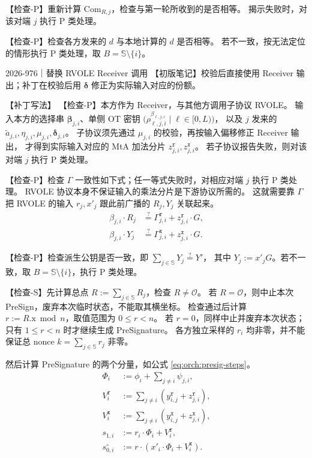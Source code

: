 【检查-P】重新计算 $\mathrm{Com}_{R,j}$，检查与第一轮所收到的是否相等。
揭示失败时，对该对端 $j$ 执行 P 类处理。

【检查-P】检查各方发来的 $d$ 与本地计算的 $d$ 是否相等。
若不一致，按无法定位的情形执行 P 类处理，取 $B=\mathbb S\setminus\{i\}$。

\begin{patchnote}{2026-976｜替换 RVOLE Receiver 调用}
【初版笔记】校验后直接使用 Receiver 输出；补丁在校验后用 $\boldsymbol\delta$ 修正为实际输入对应的份额。

【补丁写法】
【检查-P】本方作为 Receiver，与其他方调用子协议 RVOLE。
输入本方的选择串 $\boldsymbol{\beta}_{j,i}$、单侧 OT 密钥
$\bigl(\rho^{\beta_{\ell,j,i}}_{\ell,j,i} \mid \ell\in[0,L)\bigr)$，
以及 $j$ 发来的 $\tilde a_{j,i},\eta_{j,i},\mu_{j,i},\boldsymbol\delta_{j,i}$。
子协议须先通过 $\mu_{j,i}$ 的校验，再按输入偏移修正 Receiver 输出，
才得到实际输入对应的 MtA 加法分片 $z^\mathtt{r}_{j,i},z^\mathtt{x}_{j,i}$。
若子协议报告失败，则对该对端 $j$ 执行 P 类处理。
\end{patchnote}

【检查-P】检查 $\Gamma$ 一致性如下式；任一等式失败时，对相应对端 $j$ 执行 P 类处理。
RVOLE 协议本身不保证输入的乘法分片是下游协议所需的。
这就需要靠 $\Gamma$ 把 RVOLE 的输入 $r_j, x'_j$ 跟此前广播的 $R_j, Y_j$ 关联起来。
\begin{align*}
\beta_{j,i} \cdot R_j &\stackrel{?}{=} \Gamma^\mathtt{r}_{j,i} + z^\mathtt{r}_{j,i} \cdot G, \\
\beta_{j,i} \cdot Y_j &\stackrel{?}{=} \Gamma^\mathtt{x}_{j,i} + z^\mathtt{x}_{j,i} \cdot G.
\end{align*}

【检查-P】检查派生公钥是否一致，即 $\sum_{j\in\mathbb{S}}Y_j \stackrel{?}{=} Y'$，
其中 $Y_j:=x'_j G$。若不一致，取 $B=\mathbb S\setminus\{i\}$，执行 P 类处理。

【检查-S】先计算总点 $R := \sum_{j\in\mathbb S} R_j$，检查 $R\ne\mathcal O$。
若 $R=\mathcal O$，则中止本次 PreSign，废弃本次临时状态，不能取其横坐标。
检查通过后计算 $r := R.\mathrm{x} \bmod n$，取值范围为 $0\le r<n$。
若 $r=0$，同样中止并废弃本次状态；只有 $1\le r<n$ 时才继续生成 PreSignature。
各方独立采样的 $r_i$ 均非零，并不能保证总 nonce $k=\sum_{j\in\mathbb S}r_j$ 非零。

然后计算 PreSignature 的两个分量，如公式 \eqref{eq:orch:presig-steps}。
\begin{equation}
\label{eq:orch:presig-steps}\tag{presig-steps}
\begin{aligned}
  \Phi_i &:= \phi_i + \sum_{j\ne i}\psi_{j,i}, \\
  V^\mathtt{r}_i &:= \sum_{j\ne i}(y^\mathtt{r}_{i,j} + z^\mathtt{r}_{j,i}), \\
  V^\mathtt{x}_i &:= \sum_{j\ne i}(y^\mathtt{x}_{i,j} + z^\mathtt{x}_{j,i}), \\
  s_{1,i} &:= r_i \cdot \Phi_i + V^\mathtt{r}_i, \\
  s_{0,i}^\circ &:= r \cdot (x'_i \cdot \Phi_i + V^\mathtt{x}_i).
\end{aligned}
\end{equation}

